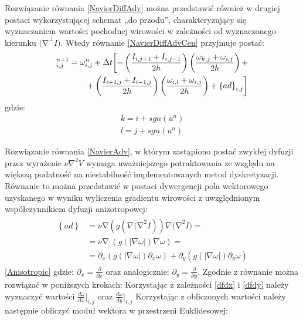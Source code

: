 \documentclass[12pt, twoside, openany]{report}
\theoremstyle{definition}
\begin{document}
Rozwiązanie równania \eqref{NavierDiffAdv} można przedstawić również w drugiej postaci wykorzystującej schemat „do przodu”, charakteryzujący się wyznaczaniem wartości pochodnej wirowości w zależności od wyznaczonego kierunku ${\mathrm{(}\mathrm{\nabla }}^{\bot }I)$.  Wtedy równanie \eqref{NavierDiffAdvCen} przyjmuje postać:
\begin{align}
\fontsize{11}
{\omega }^{n+1}_{i,j} &= {\omega }^n_{i,j}+\Delta t\biggl[
-\left(\frac{I_{i,j+1}+I_{i,j-1}}{2h}\right)\left(\frac{{\omega }_{k,j}+{\omega }_{i,j}}{2h}\right)+ \notag\\ 
&\qquad+ \left(\frac{I_{i+1,j}+I_{i-1,j}}{2h}\right)\left(\frac{{\omega }_{i,l}+{\omega }_{i,j}}{2h}\right)+{\left\{ad\right\}}_{i,j} \biggr]
\label{NavierDiffAdvFor}
\end{align}
gdzie:
\begin{align}
k = i+sgn\left(u^n\right) \\
l = j+sgn(u^n)
\end{align}
\par
Rozwiązanie równania \eqref{NavierAdv}, w którym zastąpiono postać zwykłej dyfuzji przez wyrażenie $\nu {\nabla }^2V$ wymaga uważniejszego potraktowania ze względu na większą podatność na niestabilność implementowanych metod dyskretyzacji. Równanie to można przedstawić w postaci dywergencji pola wektorowego uzyskanego w wyniku wyliczenia gradientu wirowości z uwzględnionym współczynnikiem dyfuzji anizotropowej:
\begin{align}
\begin{aligned}
\left\{ad\right\} 
&= \nu \mathrm{\nabla }(g(\nabla {\mathrm{(}\mathrm{\nabla }}^2I))\nabla {\mathrm{(}\mathrm{\nabla }}^2I)= \\[1ex]
&= \nu \mathrm{\nabla }\mathrm{\cdot}(g(|\nabla \omega |)\nabla \omega )=\\[1ex]
&= {\partial }_x\left(g\left(\left|\nabla \omega \right|\right){\partial }_x\omega \right)+{\partial }_y\left(g\left(\left|\nabla \omega \right|\right){\partial }_y\omega \right)
\end{aligned}
\label{Anisotropic}
\end{align}
\eqref{Anisotropic}
gdzie: ${\partial }_x=\frac{\partial }{\partial x}$ oraz analogicznie: ${\partial }_y=\frac{\partial }{\partial y}$.
Zgodnie z \cite{ebrahimi2012navier} równanie można rozwiązać w poniższych krokach:
Korzystając z zależności \eqref{dfdx} i \eqref{dfdy} należy wyznaczyć wartości ${\frac{d\omega }{dx}}\big|_{i,j}$ oraz ${\frac{d\omega }{dy}}\big|_{i,j}$
Korzystając z obliczonych wartości należy następnie obliczyć moduł wektora w przestrzeni Euklidesowej:
\end{document}
